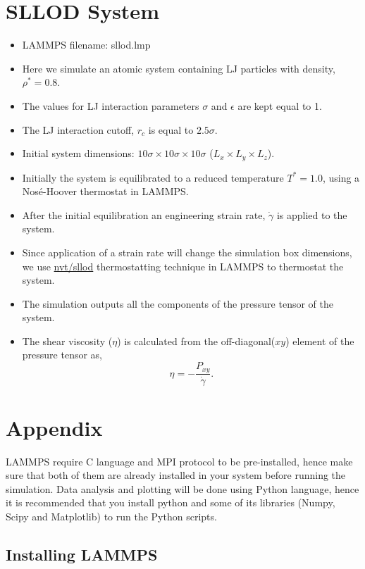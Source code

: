 \documentclass[12pt]{article}
\begin{document}
\section{SLLOD System}
\begin{itemize}
\item LAMMPS filename: sllod.lmp
\item Here we simulate an atomic system containing LJ particles with density, $\rho^{*} = 0.8$.
\item The values for LJ interaction parameters $\sigma$ and $\epsilon$ are kept equal to 1.
\item The LJ interaction cutoff, $r_c$ is equal to $2.5\sigma$.
\item Initial system dimensions: $10\sigma \times 10\sigma \times 10\sigma$ 
($L_{x} \times L_{y} \times L_{z}$).
\item Initially the system is equilibrated to a reduced temperature $T^{*} = 1.0$, 
using a Nos\'e-Hoover thermostat in LAMMPS.
\item After the initial equilibration an engineering strain rate, $\dot{\gamma}$ is 
applied to the system.
\item Since application of a strain rate will change the simulation box dimensions, we use 
\href{https://docs.lammps.org/fix_nvt_sllod.html}{nvt/sllod} thermostatting technique in LAMMPS
to thermostat the system.
\item The simulation outputs all the components of the pressure tensor of the system.
\item The shear viscosity ($\eta$) is calculated from the off-diagonal($xy$) element of the pressure tensor
as,
$$ \eta = -\frac{P_{xy}}{\dot{\gamma}}.$$

\end{itemize}

\appendix

\section{Appendix}
LAMMPS require C language and MPI protocol to be pre-installed, hence make sure that 
both of them are already installed in your system before running the simulation.
Data analysis and plotting will be done using Python language, hence it is recommended that you 
install python and some of its libraries (Numpy, Scipy and Matplotlib) to run the Python scripts.

\subsection{Installing LAMMPS}
\end{document}
